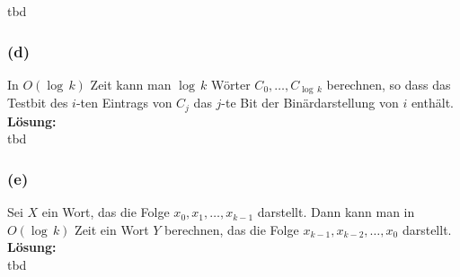 \documentclass[11pt,a4paper,ngerman]{article}
\begin{document}
tbd

\subsubsection*{(d)}
In $O(\log \, k )$ Zeit kann man $\log \, k$ Wörter $C_0, \ldots, C_{\log \, k}$ berechnen, so dass das Testbit des $i$-ten Eintrags von $C_j$ das $j$-te Bit der Binärdarstellung von $i$ enthält.\\

\noindent\textbf{Lösung:}\\

tbd

\subsubsection*{(e)}
Sei $X$ ein Wort, das die Folge $x_0, x_1, \ldots, x_{k-1}$ darstellt. Dann kann man in $O(\log \, k)$ Zeit ein Wort $Y$ berechnen, das die Folge $x_{k-1}, x_{k-2}, \ldots, x_0$ darstellt.\\

\noindent\textbf{Lösung:}\\

tbd




\label{LastPage}
\end{document}
